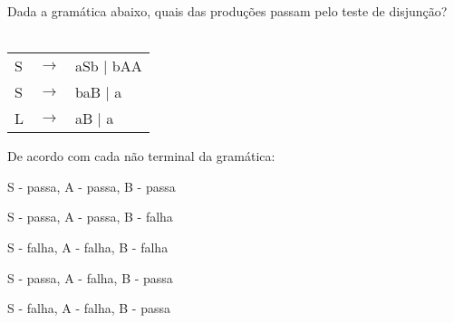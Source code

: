 \question[10]
Dada a gramática abaixo, quais das produções passam pelo teste de disjunção?\\
\\
\begin{tabular}{|l c l}
	S & $\rightarrow$ & aSb | bAA \\
    S & $\rightarrow$ & b{aB} | a \\
	L & $\rightarrow$ & aB | a \\
\end{tabular}

De acordo com cada não terminal da gramática:
\begin{choices}
\item S - passa, A - passa, B - passa
\item S - passa, A - passa, B - falha %
\item S - falha, A - falha, B - falha
\item S - passa, A - falha, B - passa
\item S - falha, A - falha, B - passa
\end{choices}
\answerline

